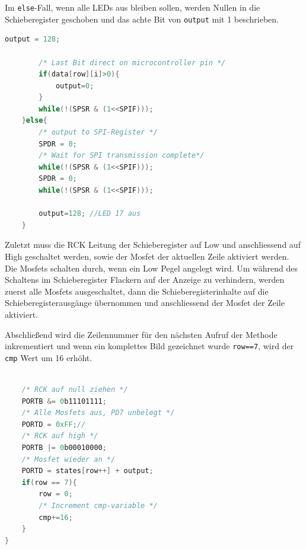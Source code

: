 Im \texttt{else}-Fall, wenn alle LEDs aus bleiben sollen, werden Nullen in die
Schieberegister geschoben und das achte Bit von \texttt{output} mit 1
beschrieben.
\begin{lstlisting}[language=C,caption=Zeichenmethode zur Ansteuerung der LED Matrix: Teil 3] output = 128;

		/* Last Bit direct on microcontroller pin */
		if(data[row][i]>0){
			output=0;
		}
		while(!(SPSR & (1<<SPIF)));
	}else{
		/* output to SPI-Register */
		SPDR = 0;
		/* Wait for SPI transmission complete*/
		while(!(SPSR & (1<<SPIF)));
		SPDR = 0;
		while(!(SPSR & (1<<SPIF)));

		output=128; //LED 17 aus
	}
\end{lstlisting} 
Zuletzt muss die RCK Leitung der Schieberegister auf Low und anschliessend auf
High geschaltet werden, sowie der Mosfet der aktuellen Zeile aktiviert werden.
Die Mosfets schalten durch, wenn ein Low Pegel angelegt wird. Um während des
Schaltens im Schieberegister Flackern auf der Anzeige zu verhindern, werden zuerst
alle Mosfets ausgeschaltet, dann die Schieberegisterinhalte auf die
Schieberegisterausgänge übernommen und anschliessend der Mosfet der Zeile
aktiviert. 

Abschließend wird die Zeilennummer für den nächsten Aufruf der Methode inkrementiert und wenn ein komplettes Bild gezeichnet wurde \texttt{row==7}, wird der
\texttt{cmp} Wert um 16 erhöht.

\begin{lstlisting}[language=C,caption=Zeichenmethode zur Ansteuerung der LED Matrix: Teil 4]

	/* RCK auf null ziehen */
	PORTB &= 0b11101111;
	/* Alle Mosfets aus, PD7 unbelegt */
	PORTD = 0xFF;//
	/* RCK auf high */
	PORTB |= 0b00010000;
	/* Mosfet wieder an */
	PORTD = states[row++] + output;
	if(row == 7){
		row = 0;
		/* Increment cmp-variable */
		cmp+=16;
	}
}
\end{lstlisting}

